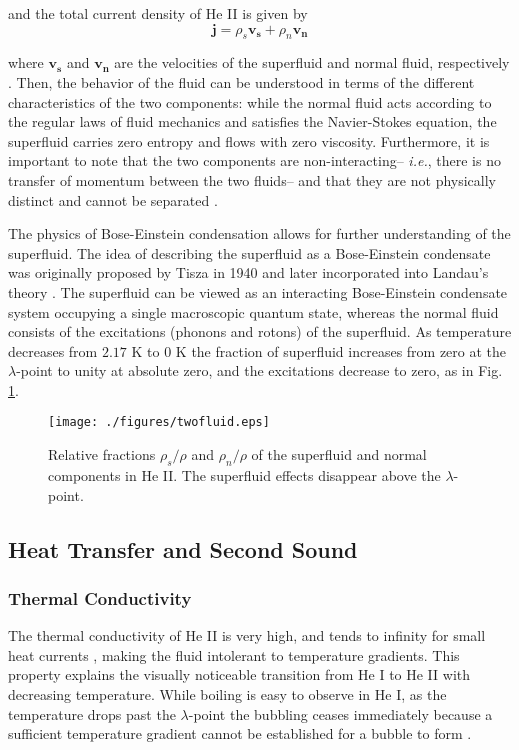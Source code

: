 and the total current density of He II is given by
\begin{equation}
\mathbf{j} = \rho_s\mathbf{v_s} + \rho_n\mathbf{v_n}
\end{equation}

where $\mathbf{v_s}$ and $\mathbf{v_n}$ are the velocities of the
superfluid and normal fluid, respectively \cite{tilley}. Then, the
behavior of the fluid can be understood in terms of the different
characteristics of the two components: while the normal fluid acts
according to the regular laws of fluid mechanics and satisfies the
Navier-Stokes equation, the superfluid carries zero entropy and flows
with zero viscosity. Furthermore, it is important to note that the two
components are non-interacting-- \emph{i.e.}, there is no transfer of
momentum between the two fluids-- and that they are
not physically distinct and cannot be separated \cite{tilley}.

The physics of Bose-Einstein condensation allows for further
understanding of the superfluid. The idea of describing the superfluid
as a Bose-Einstein condensate was originally proposed by Tisza in 1940
and later incorporated into Landau's theory \cite{tisza}. The
superfluid can be viewed as an interacting Bose-Einstein condensate
system occupying a single macroscopic quantum state, whereas the
normal fluid consists of the excitations (phonons and rotons) of the
superfluid. As temperature decreases from $2.17$ K to $0$ K the fraction
of superfluid increases from zero at the $\lambda$-point to unity at
absolute zero, and the excitations decrease to zero, as in Fig.
\ref{fig:twofluid}\cite{andro}.

\begin{figure}[ht]
\begin{center}
\texttt{[image: ./figures/twofluid.eps]}
\caption{\small{Relative fractions $\rho_s/\rho$ and $\rho_n/\rho$ of
    the superfluid and normal components in He II\cite{andro}. The
    superfluid effects disappear above the $\lambda$-point.}}
\label{fig:twofluid}
\end{center}
\end{figure}


\subsection{Heat Transfer and Second Sound}\label{heattransferandsecondsound}

\subsubsection{Thermal Conductivity}\label{thermalconductivity}
The thermal conductivity of He II is very high, and tends to infinity
for small heat currents \cite{tilley}, making the fluid intolerant to
temperature gradients. This property explains the visually noticeable
transition from He I to He II with decreasing temperature.  While
boiling is easy to observe in He I, as the temperature drops past the
$\lambda$-point the bubbling ceases immediately because a sufficient
temperature gradient cannot be established for a bubble to
form \cite{tilley}.


